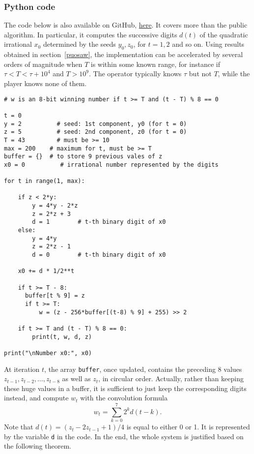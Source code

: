 \documentclass[oneside,10pt]{book}
\begin{document}
\subsubsection{Python code}\label{bornase}

The code below is also available on GitHub, \href{https://github.com/VincentGranville/Stochastic-Processes/blob/master/lottery.py}{here}.
 It covers more than the public algorithm. In particular, it computes the successive digits $d(t)$ of
 the quadratic irrational $x_0$ determined by the seeds $y_0,z_0$, for $t=1,2$ and so on. 
 Using results obtained in section~\ref{puosaw}, the implementation can be accelerated by several orders of magnitude
 when $T$ is within some known range, for instance if $\tau < T < \tau +10^4$ and $T>10^9$.  
The operator typically knows $\tau$ but not $T$, while the player knows none of them.
\vspace{1ex}

\begin{lstlisting}
# w is an 8-bit winning number if t >= T and (t - T) % 8 == 0

t = 0
y = 2          # seed: 1st component, y0 (for t = 0)
z = 5          # seed: 2nd component, z0 (for t = 0)
T = 43         # must be >= 10
max = 200    # maximum for t, must be >= T
buffer = {}  # to store 9 previous vales of z
x0 = 0          # irrational number represented by the digits 

for t in range(1, max): 

    if z < 2*y:
        y = 4*y - 2*z
        z = 2*z + 3
        d = 1        # t-th binary digit of x0  
    else:
        y = 4*y
        z = 2*z - 1
        d = 0        # t-th binary digit of x0
  
    x0 += d * 1/2**t 

    if t >= T - 8:
      buffer[t % 9] = z
      if t >= T:
          w = (z - 256*buffer[(t-8) % 9] + 255) >> 2  

    if t >= T and (t - T) % 8 == 0:
        print(t, w, d, z) 

print("\nNumber x0:", x0)
\end{lstlisting}
\vspace{1ex}

\noindent At iteration $t$, the array \texttt{buffer}, once updated, contains the 
preceding 8 values $z_{t-1}, z_{t-2},\dots, z_{t-8}$ as well as $z_t$, in circular order. Actually, rather than keeping these huge values
 in a buffer, it is sufficient to just keep the corresponding digits instead, and compute $w_t$ with the convolution formula
$$
w_t = \sum_{k=0}^7 2^k d(t-k).
$$ 
Note that $d(t) = (z_t - 2z_{t-1} + 1)/4$ is equal to either 0 or 1. It is represented by the variable  \texttt{d} in the code. 
In the end, the whole system is justified based on the following theorem.
\end{document}
